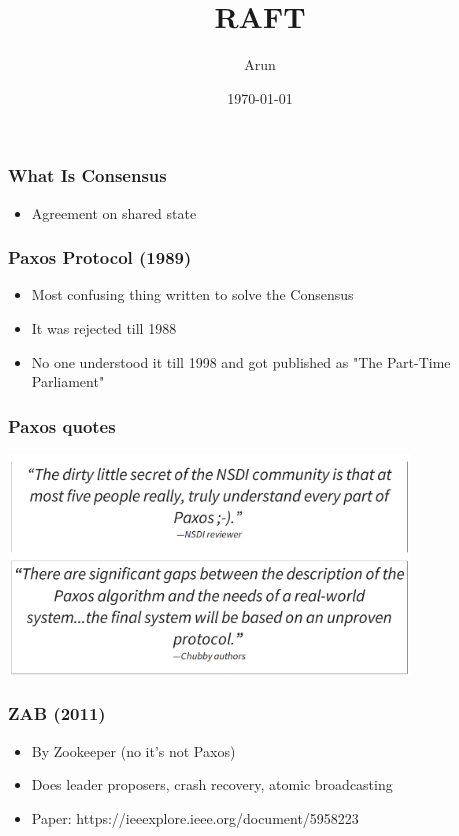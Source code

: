 \documentclass[12pt]{beamer}
\title{RAFT}
\author{Arun}
\date{\today}
\begin{document}
        \begin{frame}
            \begin{center}
                \frametitle{What Is Consensus}
                \begin{itemize}
                    \item Agreement on shared state                
                \end{itemize}
            \end{center}
        \end{frame}
    
        \begin{frame}
            \begin{center}
                \frametitle{Paxos Protocol (1989)}
                \begin{itemize}
                    \item Most confusing thing written to solve the Consensus
                    \item It was rejected till 1988
                    \item No one understood it till 1998 and got published as "The Part-Time Parliament"
                \end{itemize}
            \end{center}
        \end{frame}
    
        \begin{frame}
            \frametitle{Paxos quotes}
            \begin{center}
                \includegraphics[width=0.8\textwidth]{images/paxos-quotes.png}
            \end{center}
        \end{frame}

        \begin{frame}
            \begin{center}
                \frametitle{ZAB (2011)}
                \begin{itemize}
                    \item By Zookeeper (no it's not Paxos)
                    \item Does leader proposers, crash recovery, atomic broadcasting
                    \item Paper: https://ieeexplore.ieee.org/document/5958223
                \end{itemize}
            \end{center}
        \end{frame}
\end{document}
